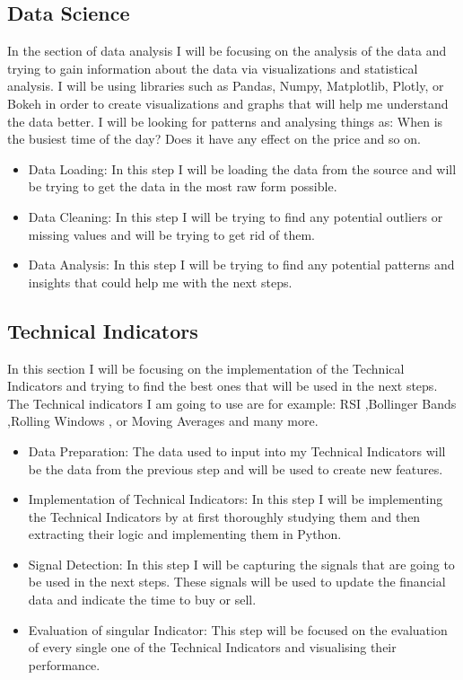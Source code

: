 \documentclass{imc-inf}
\begin{document}
	\subsection{Data Science}
	In the section of data analysis I will be focusing on the analysis of the data and trying to gain information about 
	the data via visualizations and statistical analysis. I will be using libraries such as Pandas, Numpy, Matplotlib, Plotly, or Bokeh 
	in order to create visualizations and graphs that will help me understand the data better. I will be looking for patterns and analysing things as:
	When is the busiest time of the day? Does it have any effect on the price and so on.
	\begin{itemize}
		\item Data Loading: In this step I will be loading the data from the source and will be trying to get the data in the most raw form possible.
		\item Data Cleaning: In this step I will be trying to find any potential outliers or missing values and will be trying to get rid of them.
		\item  Data Analysis: In this step I will be trying to find any potential patterns and insights that could help me with the next steps.
	\end{itemize}

	\subsection{Technical Indicators}
	In this section I will be focusing on the implementation of the Technical Indicators and trying to find the best ones that will be used in the next steps.
	The Technical indicators I am going to use are for example: RSI \cite{RSI_1},Bollinger Bands \cite{Bollinger_Bands_1},Rolling Windows \cite{Rolling_window_1}, or Moving Averages \cite{Moving_average_1} and many more.
	\begin{itemize}
		\item Data Preparation: The data used to input into my Technical Indicators will be the data from the previous step and will be used to create new features.
		\item Implementation of Technical Indicators: In this step I will be implementing the Technical Indicators by at first thoroughly studying them and then extracting 
		their logic and implementing them in Python. 
		\item Signal Detection: In this step I will be capturing the signals that are going to be used in the next steps. These signals will be used to update the financial data and indicate the time to buy or sell.
		\item Evaluation of singular Indicator: This step will be focused on the evaluation of every single one of the Technical Indicators and visualising their performance.
	\end{itemize}
\end{document}
